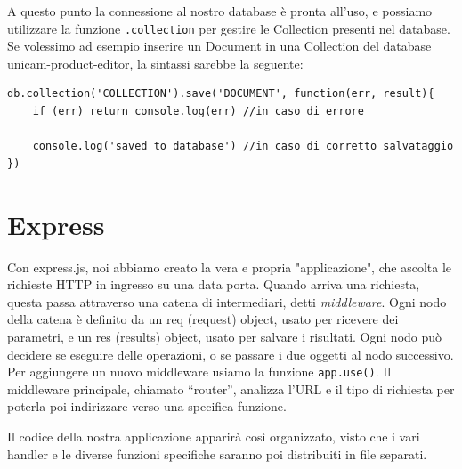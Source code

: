 A questo punto la connessione al nostro database è pronta all'uso, e possiamo utilizzare la funzione \texttt{.collection} per gestire le Collection presenti nel database.
Se volessimo ad esempio inserire un Document in una Collection del database unicam-product-editor, la sintassi sarebbe la seguente:
\begin{lstlisting}[caption={mongodb save}, style=javaScriptCode]
db.collection('COLLECTION').save('DOCUMENT', function(err, result){
	if (err) return console.log(err) //in caso di errore

	console.log('saved to database') //in caso di corretto salvataggio
})
\end{lstlisting}

\section{Express}
Con express.js\cite{express}, noi abbiamo creato la vera e propria "applicazione", che ascolta le richieste HTTP in ingresso su una data porta. Quando arriva una richiesta, questa passa attraverso una catena di intermediari, detti \emph{middleware}.
Ogni nodo della catena è definito da un req (request) object, usato per ricevere dei parametri, e un res (results) object, usato per salvare i risultati. 
Ogni nodo può decidere se eseguire delle operazioni, o se passare i due oggetti al nodo successivo. 
Per aggiungere un nuovo middleware usiamo la funzione \texttt{app.use()}. 
Il middleware principale, chiamato “router”, analizza l’URL e il tipo di richiesta per poterla poi indirizzare verso una specifica funzione.

Il codice della nostra applicazione apparirà così organizzato, visto che i vari handler e le diverse funzioni specifiche saranno poi distribuiti in file separati.

